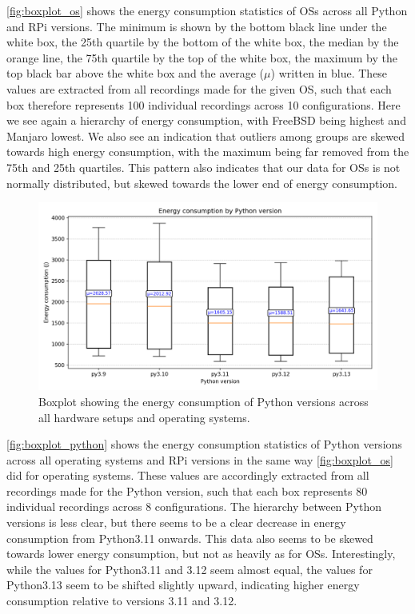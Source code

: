 \autoref{fig:boxplot_os} shows the energy consumption statistics of OSs across all Python and RPi versions. The minimum is shown by the bottom black line under the white box, the 25th quartile by the bottom of the white box, the median by the orange line, the 75th quartile by the top of the white box, the maximum by the top black bar above the white box and the average ($\mu$) written in blue. These values are extracted from all recordings made for the given OS, such that each box therefore represents 100 individual recordings across 10 configurations. Here we see again a hierarchy of energy consumption, with FreeBSD being highest and Manjaro lowest. We also see an indication that outliers among groups are skewed towards high energy consumption, with the maximum being far removed from the 75th and 25th quartiles. This pattern also indicates that our data for OSs is not normally distributed, but skewed towards the lower end of energy consumption.

\begin{figure}[H]
    \centering
    \includegraphics[width=\textwidth]{figures/energy_boxplot_by_python.png}
    \caption{Boxplot showing the energy consumption of Python versions across all hardware setups and operating systems.}
    \label{fig:boxplot_python}
\end{figure}

\autoref{fig:boxplot_python} shows the energy consumption statistics of Python versions across all operating systems and RPi versions in the same way \autoref{fig:boxplot_os} did for operating systems. These values are accordingly extracted from all recordings made for the Python version, such that each box represents 80 individual recordings across 8 configurations. The hierarchy between Python versions is less clear, but there seems to be a clear decrease in energy consumption from Python3.11 onwards. This data also seems to be skewed towards lower energy consumption, but not as heavily as for OSs. Interestingly, while the values for Python3.11 and 3.12 seem almost equal, the values for Python3.13 seem to be shifted slightly upward, indicating higher energy consumption relative to versions 3.11 and 3.12.

